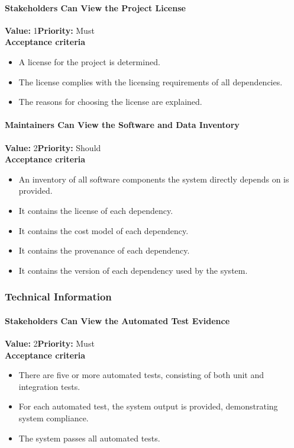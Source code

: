 \paragraph{Stakeholders Can View the Project License}
\textbf{Value:} 1\quad \textbf{Priority:} Must\\
\textbf{Acceptance criteria}
\begin{itemize}
  \item A license for the project is determined.
  \item The license complies with the licensing requirements of all dependencies.
  \item The reasons for choosing the license are explained.
\end{itemize}

\paragraph{Maintainers Can View the Software and Data Inventory}
\textbf{Value:} 2\quad \textbf{Priority:} Should\\
\textbf{Acceptance criteria}
\begin{itemize}
  \item An inventory of all software components the system directly depends on is provided.
  \item It contains the license of each dependency.
  \item It contains the cost model of each dependency.
  \item It contains the provenance of each dependency.
  \item It contains the version of each dependency used by the system.
\end{itemize}
\subsubsection{Technical Information}

\paragraph{Stakeholders Can View the Automated Test Evidence}
\textbf{Value:} 2\quad \textbf{Priority:} Must\\
\textbf{Acceptance criteria}
\begin{itemize}
  \item There are five or more automated tests, consisting of both unit and integration tests.
  \item For each automated test, the system output is provided, demonstrating system compliance.
  \item The system passes all automated tests.
\end{itemize}

